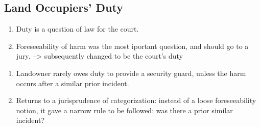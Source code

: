 \subsection{Land Occupiers' Duty}



%
\begin{enumerate}
    \item Duty is a question of law for the court.
    \item Foreseeability of harm was the most iportant question, and should go 
    to a jury. --> subsequently changed to be the court's duty
\end{enumerate}
%
%
\begin{enumerate}
\item Landowner rarely owes duty to provide a security guard, unless the harm 
occurs after a similar prior incident.
\item Returns to a jurisprudence of categorization: instead of a loose 
foreseeability notion, it gave a narrow rule to be followed: was there a prior 
similar incident?
\end{enumerate}
%
%
%
